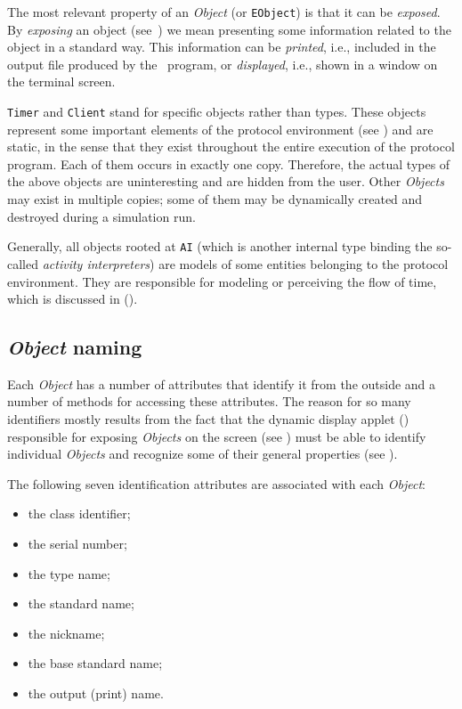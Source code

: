 The most relevant property of
an {\em Object\/} (or {\tt EObject}) is that it can be
{\em exposed}.
By {\em exposing\/} an object (see~) we mean presenting some
information related to the object in a standard way.
This information can be {\em printed}, i.e.,
included in the output file produced by the \smurph\ program,
or {\em displayed},
i.e., shown in a window on the terminal screen.

{\tt Timer} and {\tt Client} stand for specific objects rather than types.
These objects represent some important elements of the protocol environment
(see )
and are static, in the sense that they exist throughout the entire execution
of the protocol program.
Each of them occurs in exactly one copy.
Therefore,
the actual types of the above objects are uninteresting and are hidden from
the user.
Other {\em Objects\/} may exist in multiple copies; some of them may be
dynamically created and destroyed during a simulation run.

Generally, all objects rooted at {\tt AI\/} (which is another internal type
binding the so-called {\em activity interpreters\/})
are models of some entities belonging to the protocol environment.
They are responsible for modeling or perceiving
the flow of time, which is discussed in ().

\subsection{{\em Object\/} naming}
\label{rm_st_on}

Each {\em Object\/} has a number of attributes that identify it from the outside
and a number of methods for accessing these attributes.
The reason for so many identifiers mostly results from the fact that the
dynamic display applet (\dsd)
responsible for exposing {\em Objects\/} on the screen (see
) must be
able to identify individual {\em Objects\/} and recognize some of their
general properties (see ).

The following seven identification attributes are associated with each
{\em Object\/}:

\begin{itemize}
\item
the class identifier;
\item
the serial number;
\item
the type name;
\item
the standard name;
\item
the nickname;
\item
the base standard name;
\item
the output (print) name.
\end{itemize}

